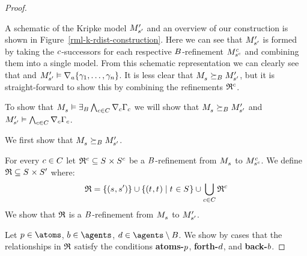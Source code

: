 \begin{proof}
\begin{figure}
\end{figure}

A schematic of the Kripke model $\kPModelP{\kStateSP}$ and an overview of our construction is shown in Figure~\ref{rml-k-rdist-construction}.
Here we can see that $\kPModelP{\kStateSP}$ is formed by taking the $\agentC$-successors for each respective $\agentsB$-refinement $\kPModel[\agentC]{\kStateS[\agentC]}$ and combining them into a single model.
From this schematic representation we can clearly see that  and $\kPModelP{\kStateSP} \entails \coversA \{\gamma_1, \dots, \gamma_n\}$.
It is less clear that $\kPModel{\kStateS} \simulatesBs \kPModelP{\kStateSP}$, but it is straight-forward to show this by combining the refinements $\refinement^\agentC$.

To show that $\kPModel{\kStateS} \entails \somerefsBs \bigwedge_{\agentC \in \agentsC} \coversC \Gamma_\agentC$ we will show that $\kPModel{\kStateS} \simulatesBs \kPModelP{\kStateSP}$ and $\kPModelP{\kStateSP} \entails \bigwedge_{\agentC \in \agentsC} \coversC \Gamma_\agentC$.

We first show that $\kPModel{\kStateS} \simulatesBs \kPModelP{\kStateSP}$.

For every $\agentC \in \agentsC$ let $\refinement^\agentC \subseteq \kStates \times \kStates[\agentC]$ be a $\agentsB$-refinement from $\kPModel{\kStateS}$ to $\kPModel[\agentC]{\kStateS[\agentC]}$.
We define $\refinement \subseteq \kStates \times \kStatesP$ where:
$$
\refinement = \{(\kStateS, \kStateSP)\} \cup \{(\kStateT, \kStateT) \mid \kStateT \in \kStates\} \cup \bigcup_{\agentC \in \agentsC} \refinement^\agentC
$$
We show that $\refinement$ is a $\agentsB$-refinement from $\kPModel{\kStateS}$ to $\kPModelP{\kStateSP}$.

Let $\atomP \in \atoms$, $\agentB \in \agents$, $\agentD \in \agents \setminus \agentsB$.
We show by cases that the relationships in $\refinement$ satisfy the conditions {\bf atoms-$\atomP$}, {\bf forth-$\agentD$}, and {\bf back-$\agentB$}.


\end{proof}
